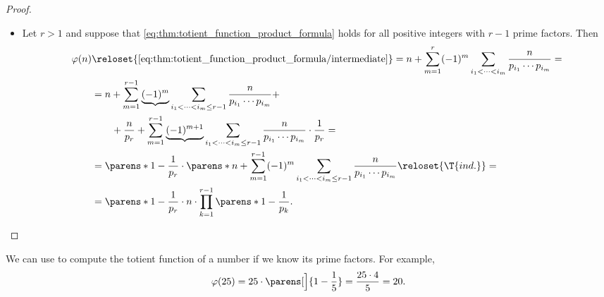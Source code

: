 \begin{proof}
\begin{itemize}
    \item Let \( r > 1 \) and suppose that \eqref{eq:thm:totient_function_product_formula} holds for all positive integers with \( r - 1 \) prime factors. Then
    \begin{align*}
      \varphi(n)
      &\reloset{\eqref{eq:thm:totient_function_product_formula/intermediate}} =
      n + \sum_{m=1}^r (-1)^m \sum_{i_1 < \cdots < i_m} \frac n {p_{i_1} \cdots p_{i_m}}
      = \\ &=
      n + \sum_{m=1}^{r-1} \underbrace{(-1)^m} \sum_{i_1 < \cdots < i_m \leq r - 1} \frac n {p_{i_1} \cdots p_{i_m}} + \\ &\quad\quad + \frac n {p_r} + \sum_{m=1}^{r-1} \underbrace{(-1)^{m+1}} \sum_{i_1 < \cdots < i_m \leq r - 1} \frac n {p_{i_1} \cdots p_{i_m}} \cdot \frac 1 {p_r}
      = \\ &=
      \parens*{ 1 - \frac 1 {p_r} } \cdot \parens*{ n + \sum_{m=1}^{r-1} (-1)^m \sum_{i_1 < \cdots < i_m \leq r - 1} \frac n {p_{i_1} \cdots p_{i_m}} }
      \reloset {\T{ind.}} = \\ &=
      \parens*{ 1 - \frac 1 {p_r} } \cdot n \cdot \prod_{k=1}^{r - 1} \parens*{ 1 - \frac 1 {p_k} }.
    \end{align*}
  \end{itemize}
\end{proof}

\begin{example}\label{ex:thm:totient_function_product_formula} We can use  to compute the totient function of a number if we know its prime factors. For example,
  \begin{equation*}
    \varphi(25) = 25 \cdot \parens[\Big]{ 1 - \frac 1 5 } = \frac {25 \cdot 4} 5 = 20.
  \end{equation*}
\end{example}

